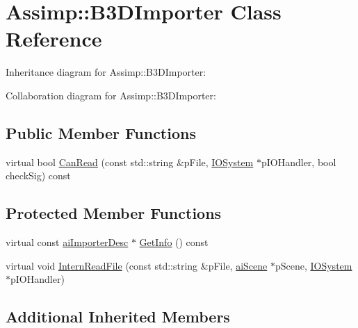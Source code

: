 \hypertarget{class_assimp_1_1_b3_d_importer}{\section{Assimp\+:\+:B3\+D\+Importer Class Reference}
\label{class_assimp_1_1_b3_d_importer}
}


Inheritance diagram for Assimp\+:\+:B3\+D\+Importer\+:


Collaboration diagram for Assimp\+:\+:B3\+D\+Importer\+:
\subsection*{Public Member Functions}
\begin{DoxyCompactItemize}
\item 
virtual bool \hyperlink{class_assimp_1_1_b3_d_importer_a473469c5a57115138767ee6472c5ff9b}{Can\+Read} (const std\+::string \&p\+File, \hyperlink{class_assimp_1_1_i_o_system}{I\+O\+System} $\ast$p\+I\+O\+Handler, bool check\+Sig) const 
\end{DoxyCompactItemize}
\subsection*{Protected Member Functions}
\begin{DoxyCompactItemize}
\item 
virtual const \hyperlink{structai_importer_desc}{ai\+Importer\+Desc} $\ast$ \hyperlink{class_assimp_1_1_b3_d_importer_a6460c9b4295e146afd2233c5324826f2}{Get\+Info} () const 
\item 
virtual void \hyperlink{class_assimp_1_1_b3_d_importer_aaeb1d48d9254e53f53772f0b0bcf764f}{Intern\+Read\+File} (const std\+::string \&p\+File, \hyperlink{structai_scene}{ai\+Scene} $\ast$p\+Scene, \hyperlink{class_assimp_1_1_i_o_system}{I\+O\+System} $\ast$p\+I\+O\+Handler)
\end{DoxyCompactItemize}
\subsection*{Additional Inherited Members}


